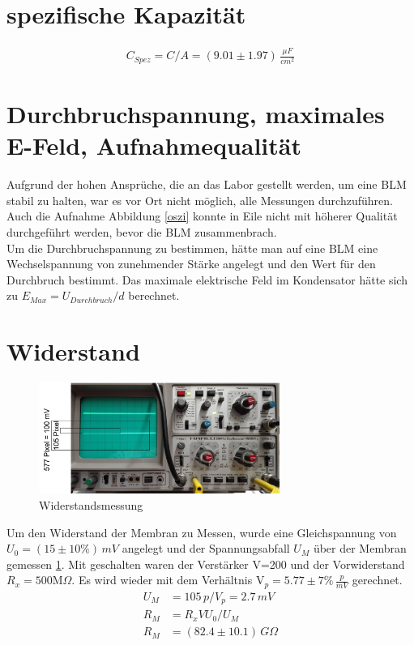 \documentclass{include/thesisclass3}
\newcommand{\e}[1]{\,\si{#1}}
\begin{document}
\section{spezifische Kapazität}
\begin{align}
C_{Spez}=C/A=(9.01 \pm 1.97)\e{\frac{\mu F}{cm^2}}
\end{align}
\section{Durchbruchspannung, maximales E-Feld, Aufnahmequalität}
Aufgrund der hohen Ansprüche, die an das Labor gestellt werden, um eine BLM stabil zu halten, war es vor Ort nicht möglich, alle Messungen durchzuführen. Auch die Aufnahme Abbildung \ref{oszi} konnte in Eile nicht mit höherer Qualität durchgeführt werden, bevor die BLM zusammenbrach.\\
Um die Durchbruchspannung zu bestimmen, hätte man auf eine BLM eine Wechselspannung von zunehmender Stärke angelegt und den Wert für den Durchbruch bestimmt. Das maximale elektrische Feld im Kondensator hätte sich zu $E_{Max}=U_{Durchbruch}/d$ berechnet.
\section{Widerstand}
\begin{figure}[ht]
	\begin{center}
		\includegraphics[width=0.7\textwidth]{images/Widerstand.png}
		\caption{Widerstandsmessung}
		\label{resistance}
	\end{center}
\end{figure}
Um den Widerstand der Membran zu Messen, wurde eine Gleichspannung von $U_0=(15 \pm 10\%)\e{mV}$ angelegt und der Spannungsabfall $U_M$ über der Membran gemessen \ref{resistance}. Mit geschalten waren der Verstärker V=200 und der Vorwiderstand $R_x=500\text{M}\Omega$. Es wird wieder mit dem Verhältnis V$_p=5.77 \pm 7\% \e{\frac{p}{mV}}$ gerechnet.
\begin{align*}
	U_M&= 105\e{p}/V_p= 2.7 \e{mV}\\
	R_M&=R_x V U_0 /U_M\\
	R_M&=(82.4 \pm 10.1)\e{G\Omega}
\end{align*}
\end{document}
